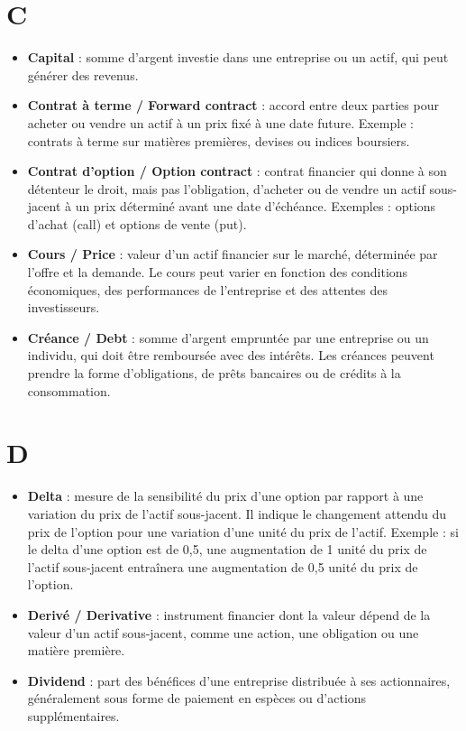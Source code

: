 \documentclass[a4paper,10pt]{article}
\begin{document}
\begin{multicols}{2}
\section*{C}
\begin{itemize}
  \item \textbf{Capital} : somme d’argent investie dans une entreprise ou un actif, qui peut générer des revenus.
  \item \textbf{Contrat à terme / Forward contract} : accord entre deux parties pour acheter ou vendre un actif à un prix fixé à une date future. Exemple : contrats à terme sur matières premières, devises ou indices boursiers.
  \item \textbf{Contrat d’option / Option contract} : contrat financier qui donne à son détenteur le droit, mais pas l’obligation, d’acheter ou de vendre un actif sous-jacent à un prix déterminé avant une date d’échéance. Exemples : options d’achat (call) et options de vente (put).
  \item \textbf{Cours / Price} : valeur d’un actif financier sur le marché, déterminée par l’offre et la demande. Le cours peut varier en fonction des conditions économiques, des performances de l’entreprise et des attentes des investisseurs.
  \item \textbf{Créance / Debt} : somme d’argent empruntée par une entreprise ou un individu, qui doit être remboursée avec des intérêts. Les créances peuvent prendre la forme d’obligations, de prêts bancaires ou de crédits à la consommation.
\end{itemize}

\section*{D}
\begin{itemize}
  \item \textbf{Delta} : mesure de la sensibilité du prix d’une option par rapport à une variation du prix de l’actif sous-jacent. Il indique le changement attendu du prix de l’option pour une variation d’une unité du prix de l’actif. Exemple : si le delta d’une option est de 0,5, une augmentation de 1 unité du prix de l’actif sous-jacent entraînera une augmentation de 0,5 unité du prix de l’option.
  \item \textbf{Derivé / Derivative} : instrument financier dont la valeur dépend de la valeur d’un actif sous-jacent, comme une action, une obligation ou une matière première.
  \item \textbf{Dividend} : part des bénéfices d’une entreprise distribuée à ses actionnaires, généralement sous forme de paiement en espèces ou d’actions supplémentaires.
\end{itemize}


\end{multicols}
\end{document}
